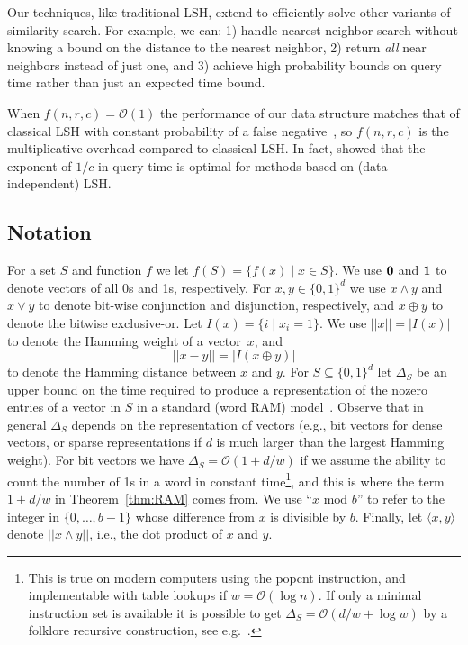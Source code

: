 \documentclass[prodmode,acmtalg]{acmsmall}
\newcommand{\Osymbol}{{\mathcal O}}
\newcommand{\BO}[1]{\Osymbol\left(#1\right)}
\begin{document}
\medskip

Our techniques, like traditional LSH, extend to efficiently solve other variants of similarity search.
For example, we can: 1) handle nearest neighbor search without knowing a bound on the distance to the nearest neighbor, 2) return \emph{all} near neighbors instead of just one, and 3) achieve high probability bounds on query time rather than just an expected time bound. 

When $f(n,r,c) = \BO{1}$ the performance of our data structure matches that of classical LSH with constant probability of a false negative~\cite{Indyk1998,gionis1999similarity}, so $f(n,r,c)$ is the multiplicative overhead compared to classical LSH.
In fact, \cite{o2014optimal} showed that the exponent of $1/c$ in query time is optimal for methods based on (data independent) LSH.


\subsection{Notation}

For a set $S$ and function $f$ we let $f(S) = \{ f(x) \; | \; x\in S\}$.
We use ${\bf 0}$ and ${\bf 1}$ to denote vectors of all 0s and 1s, respectively. 
For $x,y\in\{0,1\}^d$ we use $x\wedge y$ and $x\vee y$ to denote bit-wise conjunction and disjunction, respectively, and $x \oplus y$ to denote the bitwise exclusive-or.
Let $I(x) = \{ i \; | \; x_i = 1\}$.
We use $||x|| = |I(x)|$ to denote the Hamming weight of a vector~$x$, and 
$$||x-y|| = |I(x\oplus y)|$$
to denote the Hamming distance between $x$ and $y$.
For $S\subseteq \{0,1\}^d$ let $\Delta_S$ be an upper bound on the time required to produce a representation of the nozero entries of a vector in $S$ in a standard (word RAM) model~\cite{word-RAM}.
Observe that in general $\Delta_S$ depends on the representation of vectors (e.g., bit vectors for dense vectors, or sparse representations if $d$ is much larger than the largest Hamming weight).
For bit vectors we have $\Delta_S = \BO{1+d/w}$ if we assume the ability to count the number of 1s in a word in constant time\footnote{This is true on modern computers using the {\sc popcnt} instruction, and implementable with table lookups if $w=\BO{\log n}$. 
If only a minimal instruction set is available it is possible to get $\Delta_S = \BO{d/w + \log w}$ by a folklore recursive construction, see e.g.~\cite[Lemma 3.2]{hagerup2001deterministic}.}, and this is where the term $1+d/w$ in Theorem~\ref{thm:RAM} comes from.
We use ``$x \text{ mod } b$'' to refer to the integer in $\{0,\dots,b-1\}$ whose difference from $x$ is divisible by $b$.
Finally, let $\langle x,y\rangle $ denote $||x \wedge y||$, i.e., the dot product of $x$ and $y$.
\end{document}
